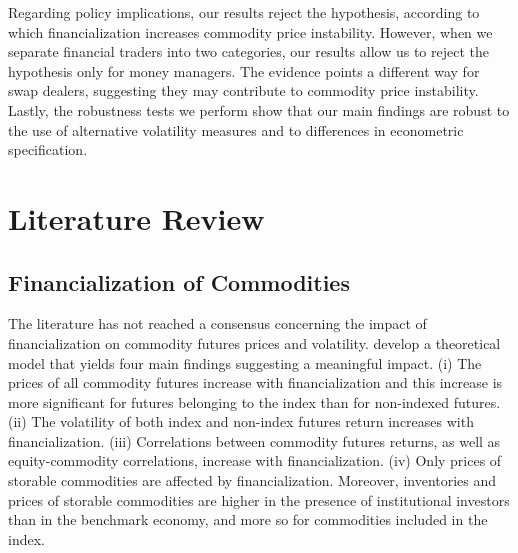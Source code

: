 \documentclass[12pt]{article}
\begin{document}
Regarding policy implications, our results reject the \citet{masters2009testimony} hypothesis, according to which  financialization increases commodity price instability.  However, when we separate financial traders into two categories, our results allow us to reject  the \citet{masters2009testimony} hypothesis only for money managers. The evidence points a different way for swap dealers, suggesting they may contribute to commodity price instability. Lastly, the robustness tests we perform show that our main findings are robust to the use of alternative volatility measures and to differences in econometric specification.







\section{Literature Review}
\subsection{Financialization of Commodities}

The literature has not reached a consensus concerning the impact of financialization on commodity futures prices and volatility. \citet{basak2016model} develop a theoretical model that yields four main findings suggesting a meaningful impact. (i) The prices of all commodity futures increase with financialization and this increase is more significant for futures belonging to the index than for non-indexed futures. (ii) The volatility of both index and non-index futures return increases with financialization. (iii) Correlations between commodity futures returns, as well as equity-commodity correlations, increase with financialization. (iv) Only prices of storable commodities are affected by financialization. Moreover, inventories and prices of storable commodities are higher in the presence of institutional investors than in the benchmark economy, and more so for commodities included in the index.
\end{document}
